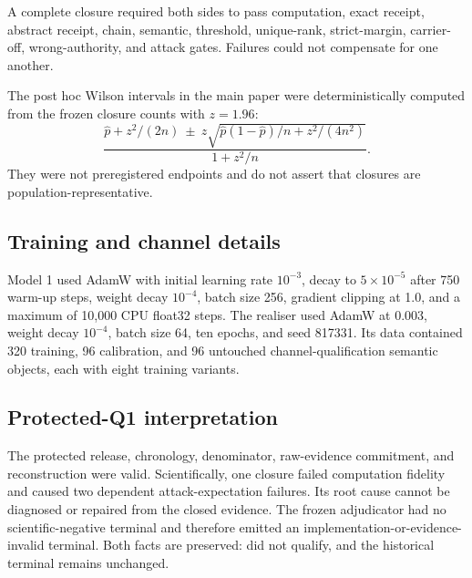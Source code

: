 A complete closure required both sides to pass computation, exact receipt, abstract receipt, chain, semantic, threshold, unique-rank, strict-margin, carrier-off, wrong-authority, and attack gates. Failures could not compensate for one another.

The post hoc Wilson intervals in the main paper were deterministically computed from the frozen closure counts with $z=1.96$:
\begin{equation}
\frac{\hat p+z^2/(2n)\ \pm\ z\sqrt{\hat p(1-\hat p)/n+z^2/(4n^2)}}{1+z^2/n}.
\end{equation}
They were not preregistered endpoints and do not assert that closures are population-representative.

\subsection{Training and channel details}
Model 1 used AdamW with initial learning rate $10^{-3}$, decay to $5\times10^{-5}$ after 750 warm-up steps, weight decay $10^{-4}$, batch size 256, gradient clipping at 1.0, and a maximum of 10,000 CPU float32 steps. The realiser used AdamW at 0.003, weight decay $10^{-4}$, batch size 64, ten epochs, and seed 817331. Its data contained 320 training, 96 calibration, and 96 untouched channel-qualification semantic objects, each with eight training variants.

\subsection{Protected-Q1 interpretation}
\label{app:q1}
The protected release, chronology, denominator, raw-evidence commitment, and reconstruction were valid. Scientifically, one closure failed computation fidelity and caused two dependent attack-expectation failures. Its root cause cannot be diagnosed or repaired from the closed evidence. The frozen adjudicator had no scientific-negative terminal and therefore emitted an implementation-or-evidence-invalid terminal. Both facts are preserved: \intqone{} did not qualify, and the historical terminal remains unchanged.

